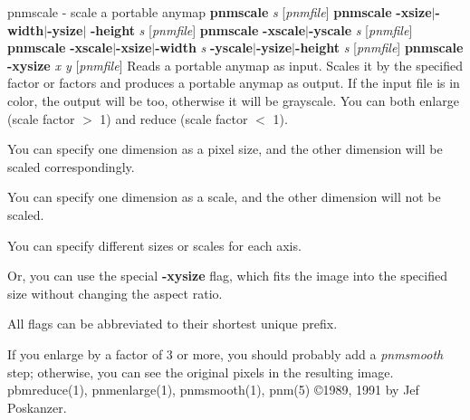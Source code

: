\newpage
%

pnmscale - scale a portable anymap
{\bf pnmscale}
{\it s}
{\rm [}{\it pnmfile}{\rm ]}
\nwl
{\bf pnmscale}
{\bf -xsize}{\rm $|$}{\bf -width}{\rm $|$}{\bf -ysize}{\rm $|$}
{\bf -height}
{\it s}
{\rm [}{\it pnmfile}{\rm ]}
\nwl
{\bf pnmscale}
{\bf -xscale}{\rm $|$}{\bf -yscale}
{\it s}
{\rm [}{\it pnmfile}{\rm ]}
\nwl
{\bf pnmscale}
{\bf -xscale}{\rm $|$}{\bf -xsize}{\rm $|$}{\bf -width}
{\it s}
{\bf -yscale}{\rm $|$}{\bf -ysize}{\rm $|$}{\bf -height}
{\it s}
{\rm [}{\it pnmfile}{\rm ]}
\nwl
{\bf pnmscale -xysize}
{\it x y}
{\rm [}{\it pnmfile}{\rm ]}
Reads a portable anymap as input.
Scales it by the specified factor or factors and produces a portable
anymap as output.
If the input file is in color, the output will be too,
otherwise it will be grayscale.
You can both enlarge (scale factor $>$ 1) and reduce (scale factor $<$ 1).
\par
You can specify one dimension as a pixel size, and the other dimension
will be scaled correspondingly.
\par
You can specify one dimension as a scale, and the other dimension
will not be scaled.
\par
You can specify different sizes or scales for each axis.
\par
Or, you can use the special
{\bf -xysize}
flag, which fits the image into
the specified size without changing the aspect ratio.
\par
All flags can be abbreviated to their shortest unique prefix.
\par
If you enlarge by a factor of 3 or more, you should probably add a
{\it pnmsmooth}
step; otherwise, you can see the original pixels in the resulting image.
pbmreduce(1), pnmenlarge(1), pnmsmooth(1), pnm(5)
\copyright 1989, 1991 by Jef Poskanzer.
%
 
